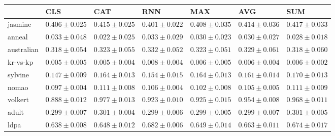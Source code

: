 \begin{tabular}{lllllll}
\toprule
 & CLS & CAT & RNN & MAX & AVG & SUM \\
\midrule
jasmine & $0.406 \pm 0.025$ & $0.415 \pm 0.025$ & $0.401 \pm 0.022$ & $0.408 \pm 0.035$ & $0.414 \pm 0.036$ & $0.417 \pm 0.033$ \\
anneal & $0.033 \pm 0.048$ & $0.022 \pm 0.025$ & $0.033 \pm 0.029$ & $0.030 \pm 0.023$ & $0.030 \pm 0.027$ & $0.028 \pm 0.018$ \\
australian & $0.318 \pm 0.054$ & $0.323 \pm 0.055$ & $0.332 \pm 0.052$ & $0.323 \pm 0.051$ & $0.329 \pm 0.061$ & $0.318 \pm 0.060$ \\
kr-vs-kp & $0.005 \pm 0.005$ & $0.005 \pm 0.004$ & $0.008 \pm 0.004$ & $0.006 \pm 0.005$ & $0.006 \pm 0.004$ & $0.006 \pm 0.002$ \\
sylvine & $0.147 \pm 0.009$ & $0.164 \pm 0.013$ & $0.154 \pm 0.015$ & $0.164 \pm 0.013$ & $0.161 \pm 0.014$ & $0.170 \pm 0.013$ \\
nomao & $0.097 \pm 0.004$ & $0.111 \pm 0.008$ & $0.106 \pm 0.004$ & $0.102 \pm 0.008$ & $0.105 \pm 0.005$ & $0.111 \pm 0.009$ \\
volkert & $0.888 \pm 0.012$ & $0.977 \pm 0.013$ & $0.923 \pm 0.010$ & $0.925 \pm 0.015$ & $0.954 \pm 0.008$ & $0.968 \pm 0.011$ \\
adult & $0.299 \pm 0.007$ & $0.301 \pm 0.004$ & $0.299 \pm 0.006$ & $0.299 \pm 0.005$ & $0.299 \pm 0.007$ & $0.301 \pm 0.005$ \\
ldpa & $0.638 \pm 0.008$ & $0.648 \pm 0.012$ & $0.682 \pm 0.006$ & $0.649 \pm 0.014$ & $0.663 \pm 0.011$ & $0.674 \pm 0.017$ \\
\bottomrule
\end{tabular}
